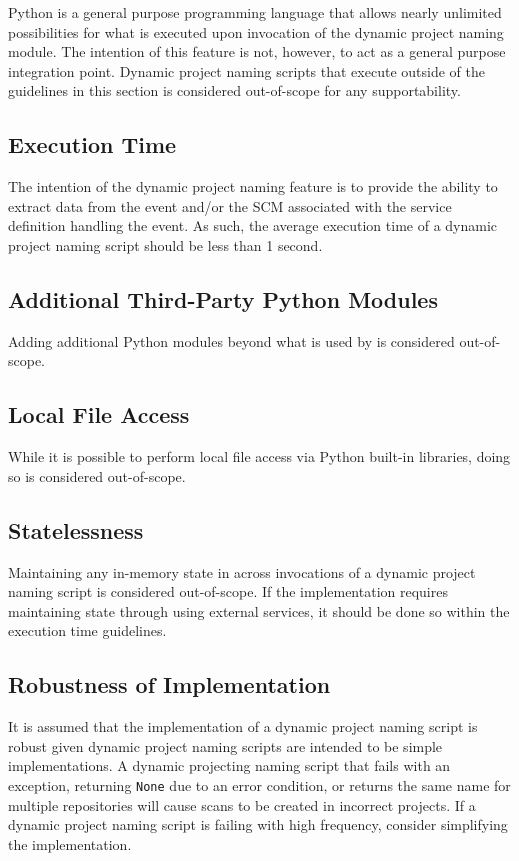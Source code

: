 Python is a general purpose programming language that allows nearly unlimited possibilities for what is
executed upon invocation of the dynamic project naming module.  The intention of this feature is not, however,
to act as a general purpose integration point.  Dynamic project naming scripts that execute outside of the
guidelines in this section is considered out-of-scope for any supportability.

\subsection{Execution Time}

The intention of the dynamic project naming feature is to provide the ability to extract data from the
event and/or the SCM associated with the service definition handling the event.  As such, the
average execution time of a dynamic project naming script should be less than 1 second.

\subsection{Additional Third-Party Python Modules}

Adding additional Python modules beyond what is used by \cxoneflow is considered out-of-scope.

\subsection{Local File Access}

While it is possible to perform local file access via Python built-in libraries, doing so
is considered out-of-scope.

\subsection{Statelessness}

Maintaining any in-memory state in across invocations of a dynamic project naming script is considered out-of-scope.
If the implementation requires maintaining state through using external services, it should be done so within the
execution time guidelines.

\subsection{Robustness of Implementation}

It is assumed that the implementation of a dynamic project naming script is robust given dynamic project naming scripts
are intended to be simple implementations.  A dynamic projecting naming script that fails with an exception, returning \texttt{None} due to an error
condition, or returns the same name for multiple repositories will cause scans to be created in incorrect projects.  If
a dynamic project naming script is failing with high frequency, consider simplifying the implementation.


